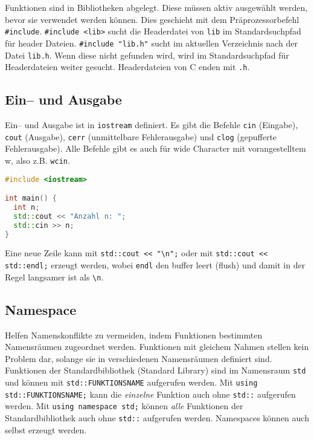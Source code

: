 Funktionen sind in Bibliotheken abgelegt. Diese müssen aktiv ausgewählt werden,
bevor sie verwendet werden können. Dies geschieht mit dem Präprozessorbefehl
\lstinline|#include|. \lstinline|#include <lib>| sucht die Headerdatei von
\lstinline|lib| im Standardsuchpfad für header Dateien.
\lstinline|#include "lib.h"| sucht im aktuellen Verzeichnis nach der Datei
\lstinline|lib.h|. Wenn diese nicht gefunden wird, wird im Standardsuchpfad für
Headerdateien weiter gesucht. Headerdateien von C enden mit \lstinline|.h|.

\subsection{Ein-- und Ausgabe}

Ein-- und Ausgabe ist in \lstinline|iostream| definiert. Es gibt die Befehle
\lstinline|cin| (Eingabe), \lstinline|cout| (Ausgabe), \lstinline|cerr|
(unmittelbare Fehlerausgabe) und \lstinline|clog| (gepufferte Fehlerausgabe).
Alle Befehle gibt es auch für wide Character mit vorangestelltem w, also z.B.
\lstinline|wcin|.

\begin{lstlisting}[language=C++]
#include <iostream>

int main() {
  int n;
  std::cout << "Anzahl n: ";
  std::cin >> n;
}
\end{lstlisting}

Eine neue Zeile kann mit \lstinline|std::cout << "\n";| oder mit
\lstinline|std::cout << std::endl;| erzeugt werden, wobei \lstinline|endl| den
buffer leert (flush) und damit in der Regel langsamer ist als \lstinline|\n|.

\subsection{Namespace}

Helfen Namenskonflikte zu vermeiden, indem Funktionen bestimmten Namensräumen
zugeordnet werden. Funktionen mit gleichem Nahmen stellen kein Problem dar,
solange sie in verschiedenen Namensräumen definiert sind. Funktionen der
Standardbibliothek (Standard Library) sind im Namensraum \lstinline|std| und
können mit \lstinline|std::FUNKTIONSNAME| aufgerufen werden. Mit
\lstinline|using std::FUNKTIONSNAME;| kann die \emph{einzelne} Funktion auch
ohne \lstinline|std::| aufgerufen werden. Mit \lstinline|using namespace std;|
können \emph{alle} Funktionen der Standardbibliothek auch ohne \lstinline|std::|
aufgerufen werden. Namespaces können auch selbst erzeugt werden.

